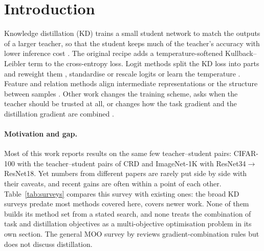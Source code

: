 \section{Introduction}
\label{sec:intro}

Knowledge distillation (KD) trains a small student network to match the outputs of a larger teacher, so that
the student keeps much of the teacher's accuracy with lower inference cost \citep{hinton2015kd}. The
original recipe adds a temperature-softened Kullback--Leibler term to the cross-entropy loss. Logit methods split the KD loss into parts and reweight them
\citep{zhao2022dkd}, standardise or rescale logits \citep{sun2024lskd} or learn the temperature
\citep{li2023ctkd}. Feature and relation methods align intermediate representations or the structure between
samples \citep{tian2020crd,chen2022simkd,zhang2025vrm}. Other work changes the training scheme, asks when the
teacher should be trusted at all, or changes how the task gradient and the distillation gradient are combined
\citep{zhao2023dot,hayder2026dtokd}.

\paragraph{Motivation and gap.} Most of this work reports results on the same few teacher--student pairs: CIFAR-100 with the
teacher--student pairs of CRD \citep{tian2020crd} and ImageNet-1K with ResNet34$\to$ResNet18. Yet numbers
from different papers are rarely put side by side with their caveats, and recent gains are often within a
point of each other. Table~\ref{tab:surveys} compares this survey with existing ones: the broad KD surveys \citep{gou2021kdsurvey,wang2022kdreview} predate most methods covered here, \citet{mansourian2025kdsurvey} covers newer work. None of them builds its method set
from a stated search, and none treats the combination of task and distillation objectives as a
multi-objective optimisation problem in its own section. The general MOO survey by \citet{chen2026gradmoo} reviews gradient-combination rules but does not discuss distillation.

